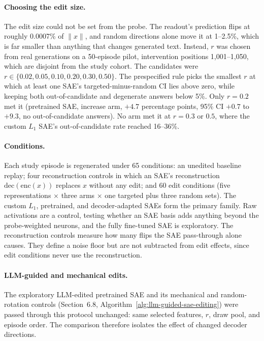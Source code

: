\paragraph{Choosing the edit size.} The edit size could not be set from the
probe. The readout's prediction flips at roughly 0.0007\% of $\lVert x\rVert$,
and random directions alone move it at 1--2.5\%, which is far smaller than
anything that changes generated text. Instead, $r$ was chosen from real
generations on a 50-episode pilot, intervention positions 1,001--1,050, which
are disjoint from the study cohort. The candidates were
$r\in\{0.02,0.05,0.10,0.20,0.30,0.50\}$. The prespecified rule picks the
smallest $r$ at which at least one SAE's targeted-minus-random CI lies above
zero, while keeping both out-of-candidate and degenerate answers below 5\%.
Only $r=0.2$ met it (pretrained SAE, increase arm, $+4.7$ percentage points,
95\% CI $+0.7$ to $+9.3$, no out-of-candidate answers). No arm met it at
$r=0.3$ or $0.5$, where the custom $L_1$ SAE's out-of-candidate rate reached
16--36\%.

\paragraph{Conditions.} Each study episode is regenerated under 65
conditions: an unedited baseline replay; four reconstruction controls in
which an SAE's reconstruction $\mathrm{dec}(\mathrm{enc}(x))$ replaces $x$
without any edit; and 60 edit conditions (five representations $\times$ three
arms $\times$ one targeted plus three random sets). The custom $L_1$,
pretrained, and decoder-adapted SAEs form the primary family. Raw activations
are a control, testing whether an SAE basis adds anything beyond the
probe-weighted neurons, and the fully fine-tuned SAE is exploratory. The
reconstruction controls measure how many flips the SAE pass-through alone
causes. They define a noise floor but are not subtracted from edit effects,
since edit conditions never use the reconstruction.

\paragraph{LLM-guided and mechanical edits.} The exploratory LLM-edited
pretrained SAE and its mechanical and random-rotation controls (Section~6.8,
Algorithm~\ref{alg:llm-guided-sae-editing}) were passed through this protocol
unchanged: same selected features, $r$, draw pool, and episode order. The
comparison therefore isolates the effect of changed decoder directions.

